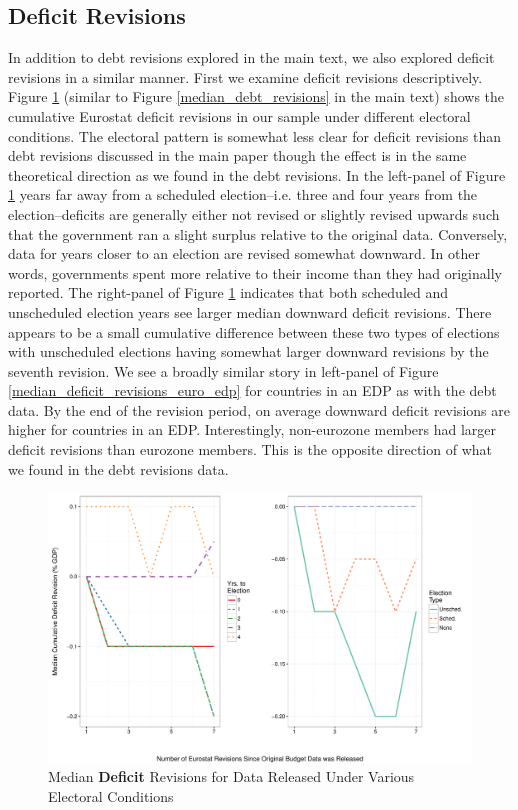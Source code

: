 \documentclass[]{article}
\begin{document}
\subsection*{Deficit Revisions}

In addition to debt revisions explored in the main text, we also explored deficit revisions in a similar manner. First we examine deficit revisions descriptively. Figure \ref{median_deficit_revisions} (similar to Figure \ref{median_debt_revisions} in the main text) shows the cumulative Eurostat deficit revisions in our sample under different electoral conditions. The electoral pattern is somewhat less clear for deficit revisions than debt revisions discussed in the main paper though the effect is in the same theoretical direction as we found in the debt revisions. In the left-panel of Figure \ref{median_deficit_revisions} years far away from a scheduled election--i.e. three and four years from the election--deficits are generally either not revised or slightly revised upwards such that the government ran a slight surplus relative to the original data. Conversely, data for years closer to an election are revised somewhat downward. In other words, governments spent more relative to their income than they had originally reported. The right-panel of Figure \ref{median_deficit_revisions} indicates that both scheduled and unscheduled election years see larger median downward deficit revisions. There appears to be a small cumulative difference between these two types of elections with unscheduled elections having somewhat larger downward revisions by the seventh revision. We see a broadly similar story in left-panel of Figure \ref{median_deficit_revisions_euro_edp} for countries in an EDP as with the debt data. By the end of the revision period, on average downward deficit revisions are higher for countries in an EDP. Interestingly, non-eurozone members had larger deficit revisions than eurozone members. This is the opposite direction of what we found in the debt revisions data.

\begin{figure}
    \begin{center}
        \caption{Median \textbf{Deficit} Revisions for Data Released Under Various Electoral Conditions}
        \label{median_deficit_revisions}
        \includegraphics[scale=0.55]{figures/median_deficit_revisions.pdf}
    \end{center}
\end{figure}
\end{document}
